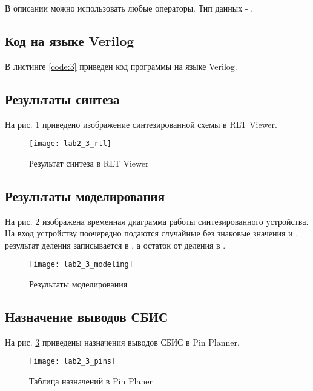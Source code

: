 В описании можно использовать любые операторы. Тип данных - .

\subsection{Код на языке Verilog}

В листинге \ref{code:3} приведен код программы на языке Verilog.



\subsection{Результаты синтеза}

На рис. \ref{fig:lab2_3_rtl} приведено изображение синтезированной схемы в RLT Viewer.

\begin{figure}[H]
\begin{center}
	\texttt{[image: lab2\_3\_rtl]}
	\caption{Результат синтеза в RLT Viewer}
	\label{fig:lab2_3_rtl}
\end{center}
\end{figure}

\subsection{Результаты моделирования}
\label{sec:lab2_3_modeling}

На рис. \ref{fig:lab2_3_modeling} изображена временная диаграмма работы синтезированного устройства. На вход устройству поочередно подаются случайные без знаковые значения  и , результат деления записывается в , а остаток от деления в .
\begin{figure}[H]
\begin{center}
	\texttt{[image: lab2\_3\_modeling]}
	\caption{Результаты моделирования}
	\label{fig:lab2_3_modeling}
\end{center}
\end{figure}

\subsection{Назначение выводов СБИС}

На рис. \ref{fig:lab2_3_pins} приведены назначения выводов СБИС в Pin Planner.

\begin{figure}[H]
\begin{center}
	\texttt{[image: lab2\_3\_pins]}
	\caption{Таблица назначений в Pin Planer}
	\label{fig:lab2_3_pins}
\end{center}
\end{figure}

